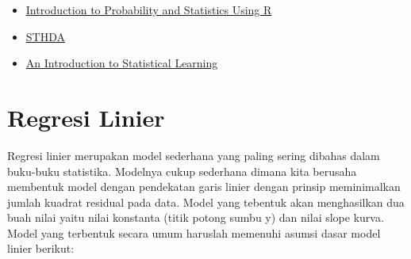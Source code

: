 \documentclass[
]{book}
\providecommand{\tightlist}{%
  \setlength{\itemsep}{0pt}\setlength{\parskip}{0pt}}
\theoremstyle{definition}
\theoremstyle{definition}
\theoremstyle{definition}
\theoremstyle{definition}
\theoremstyle{remark}
\begin{document}
\begin{itemize}
\tightlist
\item
  \href{http://ipsur.r-forge.r-project.org/book/download/IPSUR.pdf}{Introduction to Probability and Statistics Using R}
\item
  \href{http://www.sthda.com/english/}{STHDA}
\item
  \href{https://faculty.marshall.usc.edu/gareth-james/ISL/ISLR\%20Seventh\%20Printing.pdf}{An Introduction to Statistical Learning}
\end{itemize}

\hypertarget{reglin}{%
\section{Regresi Linier}\label{reglin}}

Regresi linier merupakan model sederhana yang paling sering dibahas dalam buku-buku statistika. Modelnya cukup sederhana dimana kita berusaha membentuk model dengan pendekatan garis linier dengan prinsip meminimalkan jumlah kuadrat residual pada data. Model yang tebentuk akan menghasilkan dua buah nilai yaitu nilai konstanta (titik potong sumbu y) dan nilai slope kurva. Model yang terbentuk secara umum haruslah memenuhi asumsi dasar model linier berikut:
\end{document}

